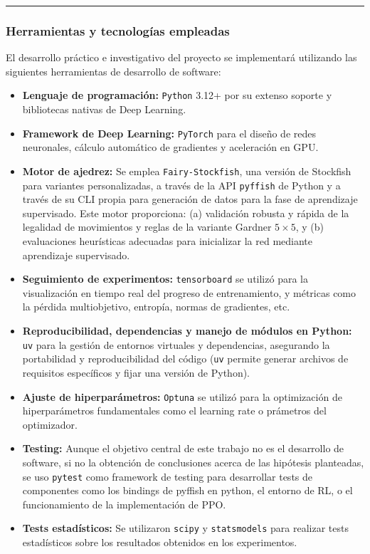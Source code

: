 \documentclass[12pt, a4paper]{article}
\begin{document}
\rule{\textwidth}{0.2pt}
\subsubsection{Herramientas y tecnologías empleadas}

El desarrollo práctico e investigativo del proyecto se implementará utilizando las siguientes herramientas de desarrollo de software:
\begin{itemize}
    \item \textbf{Lenguaje de programación:} \texttt{Python} 3.12+ por su extenso soporte y bibliotecas nativas de Deep Learning. 
    \item \textbf{Framework de Deep Learning:} \texttt{PyTorch} para el diseño de redes neuronales, cálculo automático de gradientes y aceleración en GPU.
    \item \textbf{Motor de ajedrez:} Se emplea \texttt{Fairy-Stockfish}, una versión de Stockfish para variantes personalizadas, a través de la API \texttt{pyffish} de Python y a través de su CLI propia para generación de datos para la fase de aprendizaje supervisado. Este motor proporciona: (a) validación robusta y rápida de la legalidad de movimientos y reglas de la variante Gardner $5\times5$, y (b) evaluaciones heurísticas adecuadas para inicializar la red mediante aprendizaje supervisado.
    \item \textbf{Seguimiento de experimentos:} \texttt{tensorboard} se utilizó para la visualización en tiempo real del progreso de entrenamiento, y métricas como la pérdida multiobjetivo, entropía, normas de gradientes, etc.
    \item \textbf{Reproducibilidad, dependencias y manejo de módulos en Python:} \texttt{uv} para la gestión de entornos virtuales y dependencias, asegurando la portabilidad y reproducibilidad del código (\texttt{uv} permite generar archivos de requisitos específicos y fijar una versión de Python).
    \item \textbf{Ajuste de hiperparámetros:} \texttt{Optuna} se utilizó para la optimización de hiperparámetros fundamentales como el learning rate o prámetros del optimizador. 
    \item \textbf{Testing:} Aunque el objetivo central de este trabajo no es el desarrollo de software, si no la obtención de conclusiones acerca de las hipótesis planteadas, se uso \texttt{pytest} como framework de testing para desarrollar tests de componentes como los bindings de pyffish en python, el entorno de RL, o el funcionamiento de la implementación de PPO.
    \item \textbf{Tests estadísticos:} Se utilizaron \texttt{scipy} y \texttt{statsmodels} para realizar tests estadísticos sobre los resultados obtenidos en los experimentos.
\end{itemize}
\end{document}
